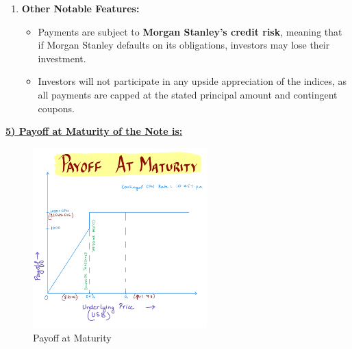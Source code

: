 \documentclass[12pt,a4paper]{article}
\begin{document}
\begin{enumerate}[label=\textbf{\arabic*.}]
    \item \textbf{Other Notable Features:} \\
    \begin{itemize}
        \item Payments are subject to \textbf{Morgan Stanley’s credit risk}, meaning that if Morgan Stanley defaults on its obligations, investors may lose their investment.
        \item Investors will not participate in any upside appreciation of the indices, as all payments are capped at the stated principal amount and contingent coupons.
    \end{itemize}
\end{enumerate}

\vspace{0.5cm}

\underline{\textbf{5) Payoff at Maturity of the Note is:}}
\begin{figure}[H]
    \centering
    \includegraphics[width=0.6\textwidth, height=0.3\textheight]{Images/payoff_project_1.png}
    \caption{Payoff at Maturity}
    \label{fig:yourlabel}
\end{figure}

\clearpage  %
\end{document}
